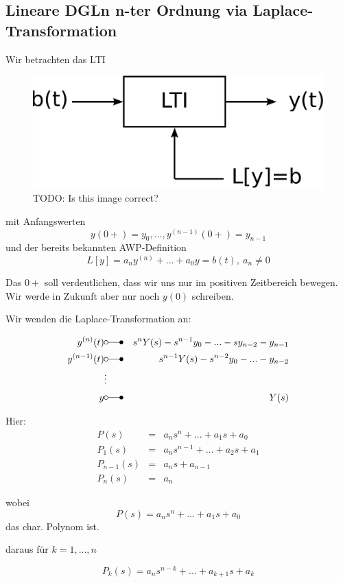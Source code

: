 \documentclass[10pt,a4paper]{article}
\begin{document}
\subsection{Lineare DGLn n-ter Ordnung via Laplace-Transformation}

Wir betrachten das LTI 

\begin{figure}[H]
\centering
\includegraphics[width=\textwidth]{images/lti01} 
\caption{TODO: Is this image correct?}
\end{figure}

mit Anfangswerten $$y(0+)=y_0, ..., y^{(n-1)}(0+)=y_{n-1}$$ und der bereits bekannten AWP-Definition $$L[y]=a_n y^{(n)}+...+a_0y = b(t), ~ a_n \not= 0$$

Das $0+$ soll verdeutlichen, dass wir uns nur im positiven Zeitbereich bewegen. Wir werde in Zukunft aber nur noch $y(0)$ schreiben.

Wir wenden die Laplace-Transformation an:

\begin{eqnarray*}
y^{(n)}(t) &\laplace & s^{n}Y(s)-s^{n-1}y_0-...-sy_{n-2}-y_{n-1} \\
y^{(n-1)}(t) &\laplace & s^{n-1}Y(s)-s^{n-2}y_0-...-y_{n-2} \\
&\vdots&\\
y &\laplace &Y(s)
\end{eqnarray*}


Hier:
\begin{eqnarray*}
P(s)&=&a_n s^{n}+...+ a_1 s + a_0 \\
P_1(s)&=&a_n s^{n-1}+...+ a_2 s + a_1\\
P_{n-1}(s)&=&a_ns + a_{n-1}\\
P_n(s)&=&a_n
\end{eqnarray*}

wobei
$$P(s)=a_n s^{n}+...+ a_1 s + a_0$$ das char. Polynom ist.


daraus für $k=1,..., n$

$$P_k(s)= a_n s^{n-k}+...+a_{k+1}s+a_k$$ 
\end{document}

